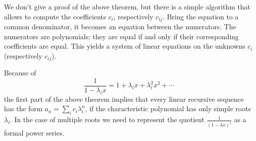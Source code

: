 
We don't give a proof of the above theorem, but there is a simple algorithm that allows to compute the coefficients $c_i$, respectively $c_{ij}$.
Bring the equation to a common denominator, it becomes an equation between the numerators.
The numerators are polynomials; they are equal if and only if their corresponding coefficients are equal.
This yields a system of linear equations on the unknowns $c_i$ (respectively $c_{ij}$).

Because of
\[
\frac{1}{1-\lambda_i x} = 1 + \lambda_i x + \lambda_i^2 x^2 + \cdots
\]
the first part of the above theorem implies that every linear recursive sequence has the form $a_n = \sum_i c_i \lambda_i^n$,
if the characteristic polynomial has only simple roots $\lambda_i$.
In the case of multiple roots we need to represent the quotient $\frac{1}{(1-\lambda x)^j}$ as a formal power series.

